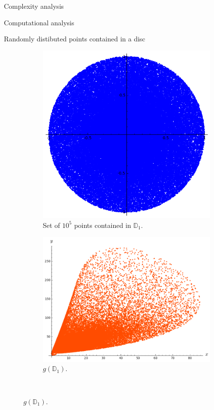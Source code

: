 \documentclass[11pt, a4paper, english, twoside, notitlepage, openright]{report}
\begin{document}
\begin{chapter}{Complexity analysis}
\begin{section}{Computational analysis}
\begin{subsection}{Randomly distibuted points contained in a disc}
\begin{figure}[ht!]
\vspace{-0.6cm}
\hspace{0.1cm}
\begin{subfigure}{.45\linewidth}\centering
\includegraphics[width=1\textwidth]{plots/ch5_34_disc.png}
\vspace{-0.4cm}\caption{Set of $10^5$ points contained in ${\mathbb D}_1$.\label{fig:disc}}
\end{subfigure}
\begin{subfigure}{.49\linewidth}\centering
\includegraphics[width=1\textwidth]{plots/ch5_35_disc1.png}
\vspace{-0.4cm}\caption{$g({\mathbb D}_1)$.\label{fig:disc1}}
\end{subfigure}\\[1ex]
\vspace{-0.2cm}


\end{figure}
\end{subsection}
\end{section}
\end{chapter}
\end{document}
